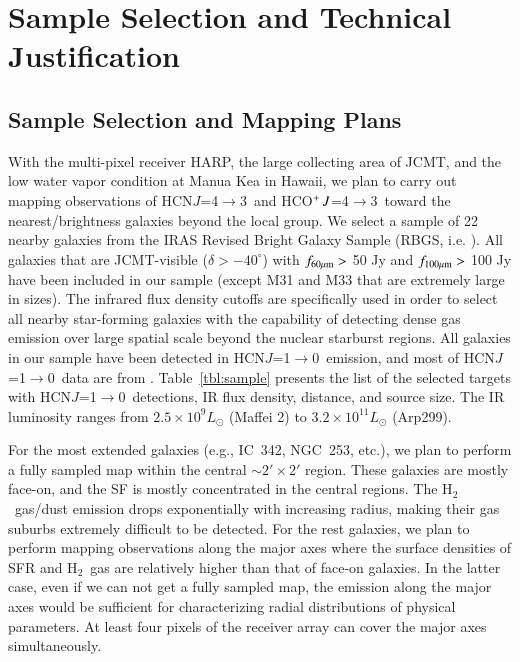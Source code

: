 \documentclass[legal,11pt]{article}
\def\,{\thinspace}
\def\Htwo{H$_2$}
\def\Htwo       {H$_2$}
\def\HCNoz      {HCN\,$J$=1$\rightarrow$0}
\def\HCNft        {HCN\,$J$=4$\rightarrow$3}
\def\HCOPft     {HCO$^+\,J$=4$\rightarrow$3}
\begin{document}
\section{Sample Selection and Technical Justification}

\subsection{Sample Selection and Mapping Plans} 

With the multi-pixel receiver HARP, the large collecting area of JCMT, and the
low water vapor condition at Manua Kea in Hawaii, we plan to carry out mapping
observations of \HCNft\ and \HCOPft\ toward the nearest/brightness galaxies
beyond the local group. We select a sample of 22 nearby galaxies from the IRAS
Revised Bright Galaxy Sample (RBGS, i.e. \citealt{smk03}). All galaxies that
are JCMT-visible ($\delta > -40^\circ$) with $f_{\rm 60\mu m}>$ 50 Jy and
$f_{\rm 100\mu m}>$ 100 Jy have been included in our sample (except M31 and M33
that are extremely large in sizes). The infrared flux density cutoffs are
specifically used in order to select all nearby star-forming galaxies with the
capability of detecting dense gas emission over large spatial scale beyond the
nuclear starburst regions.  All galaxies in our sample have been detected in
\HCNoz\  emission, and most of \HCNoz\ data are from \citet{gs04a}.
Table~\ref{tbl:sample} presents the list of the selected targets with \HCNoz\
detections, IR flux density, distance, and source size.  The IR luminosity
ranges from $2.5 \times 10^{9} L_{\odot}$ (Maffei 2) to $3.2 \times 10^{11}
L_{\odot}$ (Arp299).  

For the most extended galaxies (e.g., IC~342, NGC~253, etc.),  we plan to
perform a fully sampled map within the central $\sim 2'\times 2 '$ region.
These galaxies are mostly face-on, and the SF is mostly concentrated in the
central regions. The \Htwo\ gas/dust emission drops exponentially with
increasing radius\citep{Leroy2009}, making their gas suburbs extremely
difficult to be detected. For the rest galaxies, we plan to perform mapping
observations along the major axes where the surface densities of SFR and \Htwo\
gas are relatively higher than that of face-on galaxies. In the latter case,
even if we can not get a fully sampled map, the emission along the major axes
would be sufficient for characterizing radial distributions of physical
parameters. At least four pixels of the receiver array can cover the major axes
simultaneously. 
\end{document}
